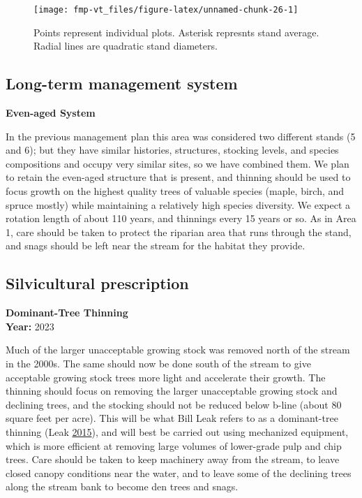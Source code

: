 \documentclass[]{tufte-handout}
\begin{document}
\begin{figure}
\texttt{[image: fmp-vt\_files/figure-latex/unnamed-chunk-26-1]} \caption[Points represent individual plots]{Points represent individual plots. Asterisk represnts stand average. Radial lines are quadratic stand diameters.}\label{fig:unnamed-chunk-26}
\end{figure}

\subsection{Long-term management
system}\label{long-term-management-system-4}

\textbf{Even-aged System}

In the previous management plan this area was considered two different
stands (5 and 6); but they have similar histories, structures, stocking
levels, and species compositions and occupy very similar sites, so we
have combined them. We plan to retain the even-aged structure that is
present, and thinning should be used to focus growth on the highest
quality trees of valuable species (maple, birch, and spruce mostly)
while maintaining a relatively high species diversity. We expect a
rotation length of about 110 years, and thinnings every 15 years or so.
As in Area 1, care should be taken to protect the riparian area that
runs through the stand, and snags should be left near the stream for the
habitat they provide.

\subsection{Silvicultural
prescription}\label{silvicultural-prescription-4}

\textbf{Dominant-Tree Thinning}\\
\noindent \textbf{Year:} 2023

Much of the larger unacceptable growing stock was removed north of the
stream in the 2000s. The same should now be done south of the stream to
give acceptable growing stock trees more light and accelerate their
growth. The thinning should focus on removing the larger unacceptable
growing stock and declining trees, and the stocking should not be
reduced below b-line (about 80 square feet per acre). This will be what
Bill Leak refers to as a dominant-tree thinning (Leak
\protect\hyperlink{ref-leak_dominant-tree_2015}{2015}), and will best be
carried out using mechanized equipment, which is more efficient at
removing large volumes of lower-grade pulp and chip trees. Care should
be taken to keep machinery away from the stream, to leave closed canopy
conditions near the water, and to leave some of the declining trees
along the stream bank to become den trees and snags.
\end{document}
